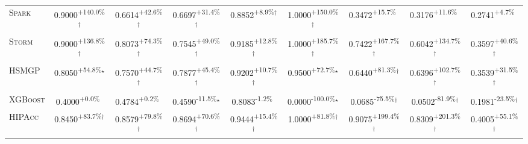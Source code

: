 \begin{table}[htbp]
\begin{tabular}{l|cccc|cccc}
\textsc{Spark} & \cellcolor{green!30}0.9000\textsuperscript{+140.0\%}$^\dagger$ & \cellcolor{green!30}0.6614\textsuperscript{+42.6\%}$^\dagger$ & \cellcolor{green!30}0.6697\textsuperscript{+31.4\%}$^\dagger$ & \cellcolor{green!30}0.8852\textsuperscript{+8.9\%}$^\dagger$ & \cellcolor{green!30}1.0000\textsuperscript{+150.0\%}$^\dagger$ & \cellcolor{green!30}0.3472\textsuperscript{+15.7\%}$^{\,\,\,}$ & \cellcolor{green!30}0.3176\textsuperscript{+11.6\%}$^{\,\,\,}$ & \cellcolor{green!30}0.2741\textsuperscript{+4.7\%}$^{\,\,\,}$ \\
\textsc{Storm} & \cellcolor{green!30}0.9000\textsuperscript{+136.8\%}$^\dagger$ & \cellcolor{green!30}0.8073\textsuperscript{+74.3\%}$^\dagger$ & \cellcolor{green!30}0.7545\textsuperscript{+49.0\%}$^\dagger$ & \cellcolor{green!30}0.9185\textsuperscript{+12.8\%}$^\dagger$ & \cellcolor{green!30}1.0000\textsuperscript{+185.7\%}$^\dagger$ & \cellcolor{green!30}0.7422\textsuperscript{+167.7\%}$^\dagger$ & \cellcolor{green!30}0.6042\textsuperscript{+134.7\%}$^\dagger$ & \cellcolor{green!30}0.3597\textsuperscript{+40.6\%}$^\dagger$ \\
\textsc{HSMGP} & \cellcolor{green!30}0.8050\textsuperscript{+54.8\%}$^\star$ & \cellcolor{green!30}0.7570\textsuperscript{+44.7\%}$^\dagger$ & \cellcolor{green!30}0.7877\textsuperscript{+45.4\%}$^\dagger$ & \cellcolor{green!30}0.9202\textsuperscript{+10.7\%}$^\dagger$ & \cellcolor{green!30}0.9500\textsuperscript{+72.7\%}$^\star$ & \cellcolor{green!30}0.6440\textsuperscript{+81.3\%}$^\dagger$ & \cellcolor{green!30}0.6396\textsuperscript{+102.7\%}$^\dagger$ & \cellcolor{green!30}0.3539\textsuperscript{+31.5\%}$^\dagger$ \\
\textsc{XGBoost} & \cellcolor{green!30}0.4000\textsuperscript{+0.0\%}$^{\,\,\,}$ & \cellcolor{green!30}0.4784\textsuperscript{+0.2\%}$^{\,\,\,}$ & \cellcolor{red!30}0.4590\textsuperscript{-11.5\%}$^\star$ & \cellcolor{red!30}0.8083\textsuperscript{-1.2\%}$^{\,\,\,}$ & \cellcolor{red!30}0.0000\textsuperscript{-100.0\%}$^\star$ & \cellcolor{red!30}0.0685\textsuperscript{-75.5\%}$^\dagger$ & \cellcolor{red!30}0.0502\textsuperscript{-81.9\%}$^\dagger$ & \cellcolor{red!30}0.1981\textsuperscript{-23.5\%}$^\dagger$ \\
\textsc{HIPAcc} & \cellcolor{green!30}0.8450\textsuperscript{+83.7\%}$^\dagger$ & \cellcolor{green!30}0.8579\textsuperscript{+79.8\%}$^\dagger$ & \cellcolor{green!30}0.8694\textsuperscript{+70.6\%}$^\dagger$ & \cellcolor{green!30}0.9444\textsuperscript{+15.4\%}$^\dagger$ & \cellcolor{green!30}1.0000\textsuperscript{+81.8\%}$^\dagger$ & \cellcolor{green!30}0.9075\textsuperscript{+199.4\%}$^\dagger$ & \cellcolor{green!30}0.8309\textsuperscript{+201.3\%}$^\dagger$ & \cellcolor{green!30}0.4005\textsuperscript{+55.1\%}$^\dagger$ \\

\end{tabular}
\end{table}
